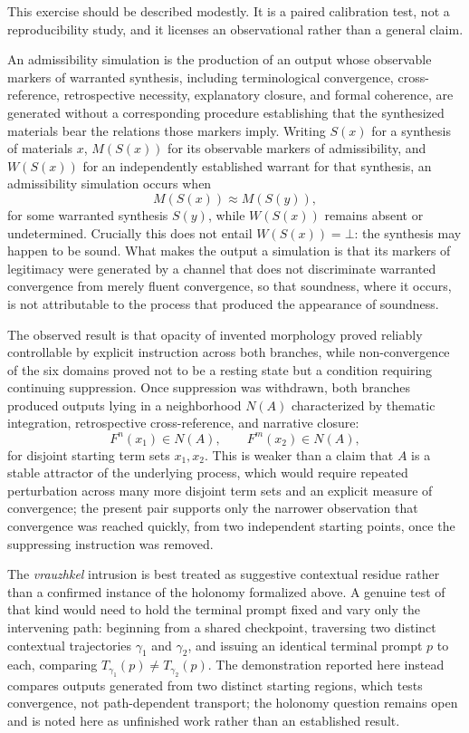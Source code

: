 This exercise should be described modestly. It is a paired calibration test, not a reproducibility study, and it licenses an observational rather than a general claim.

\begin{definition}
An admissibility simulation is the production of an output whose observable markers of warranted synthesis, including terminological convergence, cross-reference, retrospective necessity, explanatory closure, and formal coherence, are generated without a corresponding procedure establishing that the synthesized materials bear the relations those markers imply. Writing $S(x)$ for a synthesis of materials $x$, $M(S(x))$ for its observable markers of admissibility, and $W(S(x))$ for an independently established warrant for that synthesis, an admissibility simulation occurs when
\[
M(S(x)) \approx M(S(y)),
\]
for some warranted synthesis $S(y)$, while $W(S(x))$ remains absent or undetermined. Crucially this does not entail $W(S(x)) = \bot$: the synthesis may happen to be sound. What makes the output a simulation is that its markers of legitimacy were generated by a channel that does not discriminate warranted convergence from merely fluent convergence, so that soundness, where it occurs, is not attributable to the process that produced the appearance of soundness.
\end{definition}

The observed result is that opacity of invented morphology proved reliably controllable by explicit instruction across both branches, while non-convergence of the six domains proved not to be a resting state but a condition requiring continuing suppression. Once suppression was withdrawn, both branches produced outputs lying in a neighborhood $N(A)$ characterized by thematic integration, retrospective cross-reference, and narrative closure:
\[
F^n(x_1) \in N(A), \qquad F^m(x_2) \in N(A),
\]
for disjoint starting term sets $x_1, x_2$. This is weaker than a claim that $A$ is a stable attractor of the underlying process, which would require repeated perturbation across many more disjoint term sets and an explicit measure of convergence; the present pair supports only the narrower observation that convergence was reached quickly, from two independent starting points, once the suppressing instruction was removed.

The \emph{vrauzhkel} intrusion is best treated as suggestive contextual residue rather than a confirmed instance of the holonomy formalized above. A genuine test of that kind would need to hold the terminal prompt fixed and vary only the intervening path: beginning from a shared checkpoint, traversing two distinct contextual trajectories $\gamma_1$ and $\gamma_2$, and issuing an identical terminal prompt $p$ to each, comparing $T_{\gamma_1}(p) \neq T_{\gamma_2}(p)$. The demonstration reported here instead compares outputs generated from two distinct starting regions, which tests convergence, not path-dependent transport; the holonomy question remains open and is noted here as unfinished work rather than an established result.

